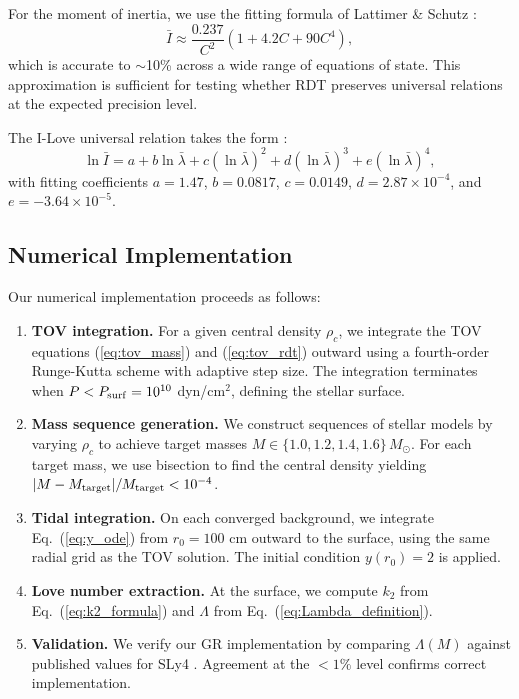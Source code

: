 \documentclass[twocolumn,showpacs,preprintnumbers,amsmath,amssymb,prd]{revtex4-2}
\begin{document}
For the moment of inertia, we use the fitting formula of Lattimer \& Schutz \cite{Lattimer2005}:
\begin{equation}
\bar{I} \approx \frac{0.237}{C^2}\left(1 + 4.2 C + 90 C^4\right),
\label{eq:I_bar_LS}
\end{equation}
which is accurate to $\sim$10\% across a wide range of equations of state. This approximation is sufficient for testing whether RDT preserves universal relations at the expected precision level.

The I-Love universal relation takes the form \cite{Yagi2013}:
\begin{equation}
\ln \bar{I} = a + b \ln \bar{\lambda} + c (\ln \bar{\lambda})^2 + d (\ln \bar{\lambda})^3 + e (\ln \bar{\lambda})^4,
\label{eq:ILove_fit}
\end{equation}
with fitting coefficients $a = 1.47$, $b = 0.0817$, $c = 0.0149$, $d = 2.87 \times 10^{-4}$, and $e = -3.64 \times 10^{-5}$.

\subsection{Numerical Implementation}
\label{sec:methods_numerical}

Our numerical implementation proceeds as follows:

\begin{enumerate}
\item \textbf{TOV integration.} For a given central density $\rho_c$, we integrate the TOV equations (\ref{eq:tov_mass}) and (\ref{eq:tov_rdt}) outward using a fourth-order Runge-Kutta scheme with adaptive step size. The integration terminates when $P < P_{\rm surf} = 10^{10}$ dyn/cm$^2$, defining the stellar surface.

\item \textbf{Mass sequence generation.} We construct sequences of stellar models by varying $\rho_c$ to achieve target masses $M \in \{1.0, 1.2, 1.4, 1.6\}\,M_\odot$. For each target mass, we use bisection to find the central density yielding $|M - M_{\rm target}|/M_{\rm target} < 10^{-4}$.

\item \textbf{Tidal integration.} On each converged background, we integrate Eq.~(\ref{eq:y_ode}) from $r_0 = 100$ cm outward to the surface, using the same radial grid as the TOV solution. The initial condition $y(r_0) = 2$ is applied.

\item \textbf{Love number extraction.} At the surface, we compute $k_2$ from Eq.~(\ref{eq:k2_formula}) and $\Lambda$ from Eq.~(\ref{eq:Lambda_definition}).

\item \textbf{Validation.} We verify our GR implementation by comparing $\Lambda(M)$ against published values for SLy4 \cite{Hinderer2010,Postnikov2010}. Agreement at the $<1\%$ level confirms correct implementation.
\end{enumerate}
\end{document}
